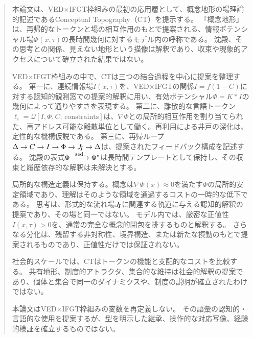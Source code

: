 \begin{abstract}
本論文は、VED$\times$IFGT枠組みの最初の応用層として、概念地形の場理論的記述であるConceptual Topography（CT）を提示する。
「概念地形」は、再帰的なトークンと場の相互作用のもとで提案される、情報ポテンシャル場$\Phi(x,\tau)$の長時間幾何に対するモデル内の呼称である。
沈殿、その思考との関係、見えない地形という描像は解釈であり、収束や現象的アクセスについて確立された結果ではない。

VED$\times$IFGT枠組みの中で、CTは三つの結合過程を中心に提案を整理する。
第一に、連続情報場$I(x,\tau)$を、VED$\times$IFGTの関係$I=f(1-C)$に対する認知的観測窓での提案的解釈に用い、有効ポテンシャル$\Phi = K * I$の幾何によって通りやすさを表現する。
第二に、離散的な言語トークン$\ell_i = \mathcal{Q}[I,\Phi,C;\,\text{constraints}]$は、$\nabla\Phi$との局所的相互作用を割り当てられた、再アドレス可能な離散単位として働く。再利用による井戸の深化は、定性的な機構仮説である。
第三に、再帰ループ$\Delta \to C \to I \to \Phi \to \JI \to \Delta$は、提案されたフィードバック構成を記述する。
沈殿の表式$\Phi \seddto \Phistar$は長時間テンプレートとして保持し、その収束と履歴依存的な解釈は未解決とする。

局所的な構造定義は保持する。概念は$\nabla\Phi(x) \approx 0$を満たす$\Phi$の局所的安定領域であり、理解はそのような領域を通過するコストの一時的な低下である。
思考は、形式的な流れ場$\JI$に関連する軌道に与える認知的解釈の提案であり、その場と同一ではない。
モデル内では、厳密な正値性$I(x,\tau) > 0$を、通常の完全な概念的閉包を排するものと解釈する。
さらなる分化は、残留する非対称性、境界構造、または新たな摂動のもとで提案されるものであり、正値性だけでは保証されない。

社会的スケールでは、CTはトークンの機能と支配的なコストを比較する。
共有地形、制度的アトラクタ、集合的な維持は社会的解釈の提案であり、個体と集合で同一のダイナミクスや、制度の説明が確立されたわけではない。

本論文はVED$\times$IFGT枠組みの変数を再定義しない。
その語彙の認知的・言語的な使用を提案するが、型を明示した継承、操作的な対応写像、経験的検証を確立するものではない。
\end{abstract}

